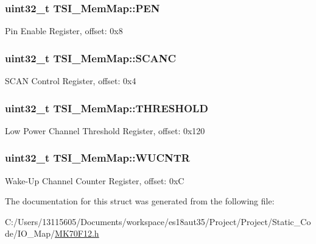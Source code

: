 \subsubsection[{P\+E\+N}]{\setlength{\rightskip}{0pt plus 5cm}uint32\+\_\+t T\+S\+I\+\_\+\+Mem\+Map\+::\+P\+E\+N}\label{struct_t_s_i___mem_map_a37c8a06461ca09948d6a65a1289bccd9}
Pin Enable Register, offset\+: 0x8 \hypertarget{struct_t_s_i___mem_map_abbf29c929817b57dbec256343e066a85}{}
\subsubsection[{S\+C\+A\+N\+C}]{\setlength{\rightskip}{0pt plus 5cm}uint32\+\_\+t T\+S\+I\+\_\+\+Mem\+Map\+::\+S\+C\+A\+N\+C}\label{struct_t_s_i___mem_map_abbf29c929817b57dbec256343e066a85}
S\+C\+A\+N Control Register, offset\+: 0x4 \hypertarget{struct_t_s_i___mem_map_a716863c50b790ef08399633c624ad313}{}
\subsubsection[{T\+H\+R\+E\+S\+H\+O\+L\+D}]{\setlength{\rightskip}{0pt plus 5cm}uint32\+\_\+t T\+S\+I\+\_\+\+Mem\+Map\+::\+T\+H\+R\+E\+S\+H\+O\+L\+D}\label{struct_t_s_i___mem_map_a716863c50b790ef08399633c624ad313}
Low Power Channel Threshold Register, offset\+: 0x120 \hypertarget{struct_t_s_i___mem_map_ae36ce42bd55889c91be08af94a07203e}{}
\subsubsection[{W\+U\+C\+N\+T\+R}]{\setlength{\rightskip}{0pt plus 5cm}uint32\+\_\+t T\+S\+I\+\_\+\+Mem\+Map\+::\+W\+U\+C\+N\+T\+R}\label{struct_t_s_i___mem_map_ae36ce42bd55889c91be08af94a07203e}
Wake-\/\+Up Channel Counter Register, offset\+: 0x\+C 

The documentation for this struct was generated from the following file\+:\begin{DoxyCompactItemize}
\item 
C\+:/\+Users/13115605/\+Documents/workspace/es18aut35/\+Project/\+Project/\+Static\+\_\+\+Code/\+I\+O\+\_\+\+Map/\hyperlink{_m_k70_f12_8h}{M\+K70\+F12.\+h}\end{DoxyCompactItemize}
